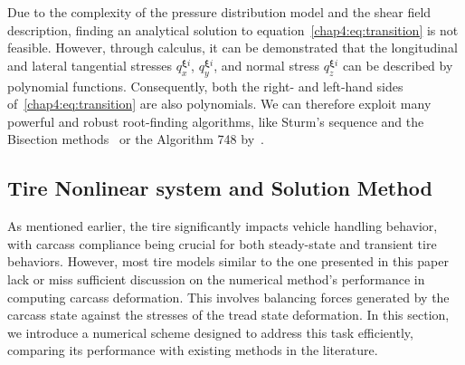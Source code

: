 Due to the complexity of the pressure distribution model and the shear field description, finding an analytical solution to equation~\eqref{chap4:eq:transition} is not feasible. However, through calculus, it can be demonstrated that the longitudinal and lateral tangential stresses $q_{x}^{\bm{\xi}i}$, $q_{y}^{\bm{\xi}i}$, and normal stress $q_{z}^{\bm{\xi}i}$ can be described by polynomial functions. Consequently, both the right- and left-hand sides of~\eqref{chap4:eq:transition} are also polynomials. We can therefore exploit many powerful and robust root-finding algorithms, like Sturm's sequence and the Bisection methods~\cite{bulirsch2002introduction} or the Algorithm 748 by~\citet{alefeld1995algorithm}.

\subsection{Tire Nonlinear system and Solution Method}

As mentioned earlier, the tire significantly impacts vehicle handling behavior, with carcass compliance being crucial for both steady-state and transient tire behaviors. However, most tire models similar to the one presented in this paper lack or miss sufficient discussion on the numerical method's performance in computing carcass deformation. This involves balancing forces generated by the carcass state against the stresses of the tread state deformation. In this section, we introduce a numerical scheme designed to address this task efficiently, comparing its performance with existing methods in the literature.

